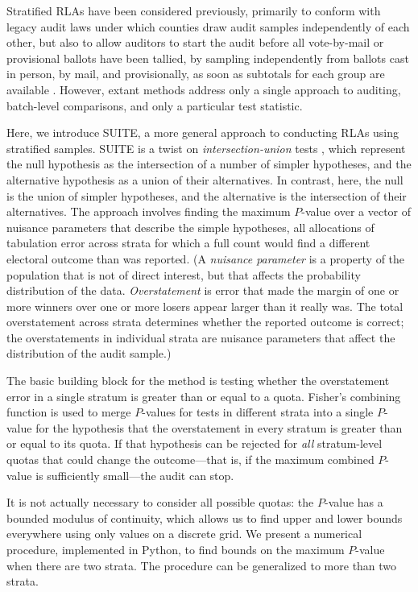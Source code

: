 \documentclass[runningheads]{llncs}
\begin{document}
Stratified RLAs have been considered previously, primarily to conform with legacy audit laws under which counties draw audit samples independently of each other, but also to allow auditors to start the audit before all vote-by-mail or provisional ballots have been tallied, by sampling independently from ballots cast in person, by mail, and provisionally, as soon as subtotals for each group are available \cite{stark08a,higginsEtal11}.
However, extant methods address only a single approach to auditing, batch-level comparisons, and only a particular test statistic.

Here, we introduce SUITE, a more general approach to conducting RLAs using stratified samples.
SUITE is a twist on \emph{intersection-union} tests \cite{pesarinSalmaso10}, which represent the null hypothesis
as the intersection of a number of simpler hypotheses, and the alternative hypothesis as a union of their alternatives.
In contrast, here, the null is the union of simpler hypotheses, and the alternative is the intersection of their alternatives.
The approach involves finding the maximum $P$-value over a vector of nuisance parameters that describe the simple hypotheses, 
all allocations of tabulation error across strata for which a full count would find a different electoral outcome than was reported.
(A \emph{nuisance parameter} is a property of the population that is not of direct interest, but that affects the probability distribution of the data. 
\emph{Overstatement} is error that made the margin of one or more winners over one or more losers appear larger than it really was.
The total overstatement across strata determines whether the reported outcome is correct; 
the overstatements in individual strata are nuisance parameters that affect the distribution of the audit sample.)

The basic building block for the method is testing whether the overstatement error in a single stratum is greater than or equal to a quota.
Fisher's combining function is used to merge $P$-values for tests in different strata into a single $P$-value for the hypothesis that the overstatement in every stratum is greater than or equal to its quota.
If that hypothesis can be rejected for \emph{all} stratum-level quotas that could change the outcome---that is, if the maximum combined $P$-value is sufficiently small---the audit can stop.

It is not actually necessary to consider all possible quotas: the $P$-value
has a bounded modulus of continuity, which allows us to find upper and lower bounds 
everywhere using only values on a discrete grid.
We present a numerical procedure, implemented in Python,
to find bounds on the maximum $P$-value when there are two strata.
The procedure can be generalized to more than two strata.
\end{document}
